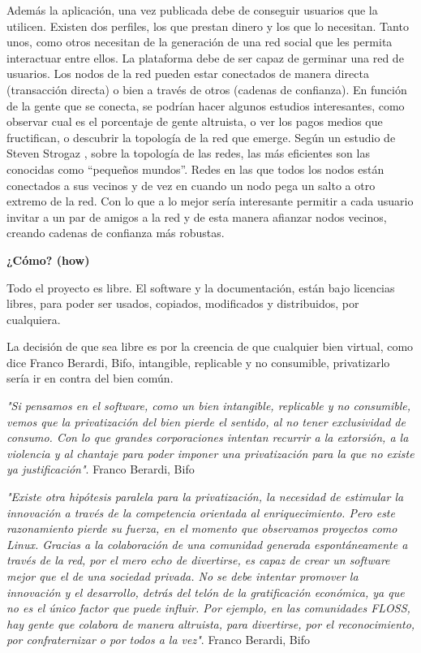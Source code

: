 \documentclass[a4paper, 12pt]{book}
\begin{document}
Además la aplicación, una vez publicada debe de conseguir usuarios que la 
utilicen. Existen dos perfiles, los que prestan dinero y los que lo necesitan. 
Tanto unos, como otros necesitan de la generación de una red social que les 
permita interactuar entre ellos. La plataforma debe de ser capaz de germinar 
una red de usuarios. Los nodos de la red pueden estar conectados de manera 
directa (transacción directa) o bien a través de otros (cadenas de confianza).
En función de la gente que se conecta, se podrían hacer algunos estudios 
interesantes, como observar cual es el porcentaje de gente altruista, o ver los 
pagos medios que fructifican, o descubrir la topología de la red que emerge.
Según un estudio de Steven Strogaz \cite{Steven Strogaz}, sobre la topología 
de las redes, las más eficientes son las conocidas como ``pequeños mundos''.
Redes en las que todos los nodos están conectados a sus vecinos y de vez en 
cuando un nodo pega un salto a otro extremo de la red. Con lo que a lo mejor 
sería interesante permitir a cada usuario invitar a un par de amigos a la red 
y de esta manera afianzar nodos vecinos, creando cadenas de confianza más 
robustas.

\textbf{¿Cómo? (how)}

Todo el proyecto es libre. El software y la documentación, están bajo licencias 
libres, para poder ser usados, copiados, modificados y distribuidos, 
por cualquiera.

La decisión de que sea libre es por la creencia de que cualquier bien virtual, 
como dice Franco Berardi, Bifo, intangible, replicable y no consumible, 
privatizarlo sería ir en contra del bien común.

\textit{"Si pensamos en el software, como un bien intangible, replicable y no 
consumible, vemos que la privatización del bien pierde el sentido, al no tener 
exclusividad de consumo. Con lo que grandes corporaciones intentan recurrir a 
la extorsión, a la violencia y al chantaje para poder imponer una privatización 
para la que no existe ya justificación"}. Franco Berardi, Bifo 
\cite{Bifo Cap. Fraternidad, saber, no saber}

\textit{"Existe otra hipótesis paralela para la privatización, la necesidad de 
estimular la innovación a través de la competencia orientada al enriquecimiento. 
Pero este razonamiento pierde su fuerza, en el momento que observamos proyectos 
como Linux. Gracias a la colaboración de una comunidad generada espontáneamente 
a través de la red, por el mero echo de divertirse, es capaz de crear un 
software mejor que el de una sociedad privada. No se debe intentar promover la 
innovación y el desarrollo, detrás del telón de la gratificación económica, ya 
que no es el único factor que puede influir. Por ejemplo, en las comunidades 
FLOSS, hay gente que colabora de manera altruista, para divertirse, por el 
reconocimiento, por confraternizar o por todos a la vez"}.  Franco Berardi, 
Bifo \cite{Bifo Cap. Fraternidad, saber, no saber}
\end{document}

